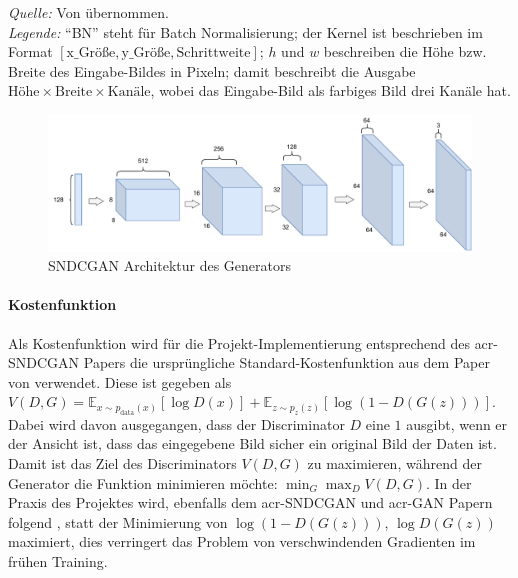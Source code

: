 \begin{table}[]
\begin{center}
\begin{minipage}{.5\linewidth}
\begin{tabular}{lcl}
            \bottomrule
        \end{tabular}
    \end{minipage} 
  \end{center}
  \begin{center}
    \bigskip
    \emph{Quelle:} Von \cite[S. 12]{kurach2018gan} übernommen.\\
    \emph{Legende:} \enquote{BN} steht für Batch Normalisierung; der Kernel ist beschrieben im Format $[\text{x\_Größe},
    \text{y\_Größe}, \text{Schrittweite}]$; $h$ und $w$ beschreiben die Höhe
    bzw. Breite des Eingabe-Bildes in Pixeln; damit beschreibt die Ausgabe
    $\text{Höhe} \times \text{Breite} \times \text{Kanäle}$, wobei das
    Eingabe-Bild als farbiges Bild drei Kanäle hat.
  \end{center}
\end{table}

\begin{figure}
  \caption{SNDCGAN Architektur des Generators}
  \label{img:sndcgan}
  \centering
  \includegraphics[width=\textwidth]{images/cnn3.pdf}
\end{figure}

\paragraph{Kostenfunktion} Als Kostenfunktion wird für die
Projekt-Implementierung entsprechend des \gls{acr-SNDCGAN} Papers die
ursprüngliche Standard-Kostenfunktion aus dem Paper von
\citeauthor{goodfellow2014generative} \cite{goodfellow2014generative} verwendet.
Diese ist gegeben als $V(D, G) = \mathbb{E}_{x \sim p_{\text{data}}(x)} [\log
D(x)] + \mathbb{E}_{z \sim p_{z}(z)} [\log (1-D(G(z)))]$. Dabei wird davon ausgegangen, dass der
Discriminator $D$ eine $1$ ausgibt, wenn er der Ansicht ist, dass das
eingegebene Bild sicher ein original Bild der Daten ist. Damit ist das Ziel des
Discriminators $V(D,G)$ zu maximieren, während der Generator die Funktion
minimieren möchte: $\min_{G} \max_{D} V(D,G)$. In der Praxis des Projektes wird,
ebenfalls dem \gls{acr-SNDCGAN} und \gls{acr-GAN} Papern folgend \cites{goodfellow2014generative}{miyato2018spectral}, statt der Minimierung
von $\log(1-D(G(z)))$, $\log D(G(z))$ maximiert, dies verringert das Problem von
verschwindenden Gradienten im frühen Training.

